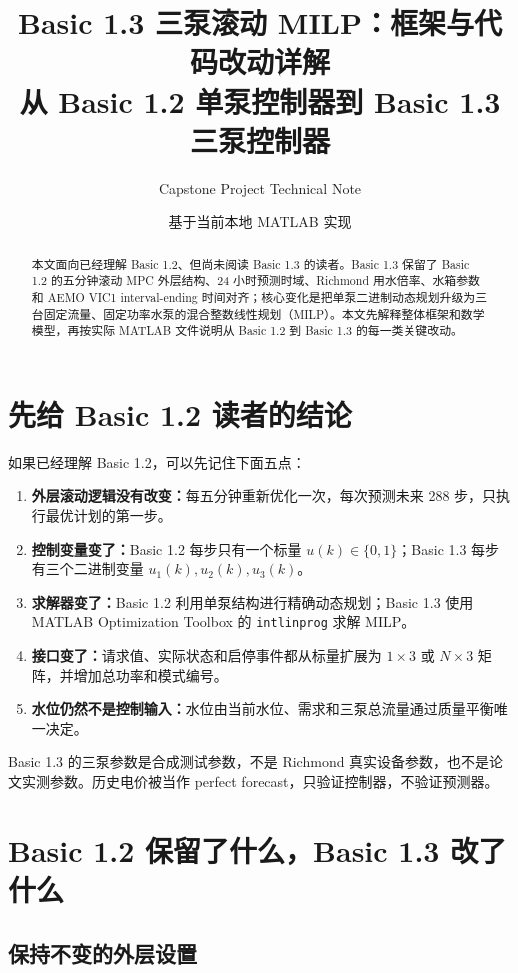 \documentclass[UTF8,a4paper,11pt]{ctexart}
\title{\textbf{Basic 1.3 三泵滚动 MILP：框架与代码改动详解}\\
\large 从 Basic 1.2 单泵控制器到 Basic 1.3 三泵控制器}
\author{Capstone Project Technical Note}
\date{基于当前本地 MATLAB 实现}
\newcommand{\code}[1]{\texttt{#1}}
\newcommand{\important}[1]{%
  \begin{center}
  \colorbox{warningyellow}{\parbox{0.94\linewidth}{#1}}
  \end{center}}
\begin{document}
\maketitle

\begin{abstract}
本文面向已经理解 Basic 1.2、但尚未阅读 Basic 1.3 的读者。Basic 1.3 保留了 Basic 1.2 的五分钟滚动 MPC 外层结构、24 小时预测时域、Richmond 用水倍率、水箱参数和 AEMO VIC1 interval-ending 时间对齐；核心变化是把单泵二进制动态规划升级为三台固定流量、固定功率水泵的混合整数线性规划（MILP）。本文先解释整体框架和数学模型，再按实际 MATLAB 文件说明从 Basic 1.2 到 Basic 1.3 的每一类关键改动。
\end{abstract}

\tableofcontents
\newpage

\section{先给 Basic 1.2 读者的结论}

如果已经理解 Basic 1.2，可以先记住下面五点：

\begin{enumerate}
  \item \textbf{外层滚动逻辑没有改变：}每五分钟重新优化一次，每次预测未来 288 步，只执行最优计划的第一步。
  \item \textbf{控制变量变了：}Basic 1.2 每步只有一个标量 $u(k)\in\{0,1\}$；Basic 1.3 每步有三个二进制变量 $u_1(k),u_2(k),u_3(k)$。
  \item \textbf{求解器变了：}Basic 1.2 利用单泵结构进行精确动态规划；Basic 1.3 使用 MATLAB Optimization Toolbox 的 \code{intlinprog} 求解 MILP。
  \item \textbf{接口变了：}请求值、实际状态和启停事件都从标量扩展为 $1\times3$ 或 $N\times3$ 矩阵，并增加总功率和模式编号。
  \item \textbf{水位仍然不是控制输入：}水位由当前水位、需求和三泵总流量通过质量平衡唯一决定。
\end{enumerate}

\important{Basic 1.3 的三泵参数是合成测试参数，不是 Richmond 真实设备参数，也不是论文实测参数。历史电价被当作 perfect forecast，只验证控制器，不验证预测器。}

\section{Basic 1.2 保留了什么，Basic 1.3 改了什么}

\subsection{保持不变的外层设置}
\end{document}
